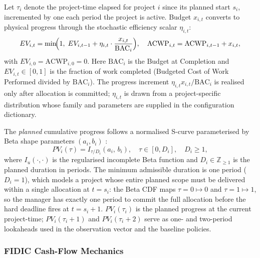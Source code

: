 Let $\tau_i$ denote the project-time elapsed for project $i$ since its
planned start $s_i$, incremented by one each period the project is
active. Budget $x_{i,t}$ converts to physical progress through the
stochastic efficiency scalar $\eta_{i,t}$:
\begin{equation}
  EV_{i,t}
    = \min\!\Bigl(1,\;
        EV_{i,t-1} + \eta_{i,t} \cdot \frac{x_{i,t}}{\mathrm{BAC}_i}
      \Bigr),
  \quad
  \mathrm{ACWP}_{i,t} = \mathrm{ACWP}_{i,t-1} + x_{i,t},
  \label{eq:progress_rec}
\end{equation}
with $EV_{i,0} = \mathrm{ACWP}_{i,0} = 0$. Here $\mathrm{BAC}_i$
is the Budget at Completion and $EV_{i,t} \in [0,1]$ is the fraction
of work completed (Budgeted Cost of Work Performed divided by
$\mathrm{BAC}_i$). The progress increment $\eta_{i,t} x_{i,t} /
\mathrm{BAC}_i$ is realised only after allocation is committed;
$\eta_{i,t}$ is drawn from a project-specific distribution whose family
and parameters are supplied in the configuration dictionary.

The \emph{planned} cumulative progress follows a normalised S-curve
parameterised by Beta shape parameters $(a_i, b_i)$
\citep{Kenley2009}:
\begin{equation}
  PV_i(\tau) = I_{\tau / D_i}(a_i,\, b_i),
  \quad \tau \in [0, D_i],\quad D_i \geq 1,
  \label{eq:scurve}
\end{equation}
where $I_u(\cdot,\cdot)$ is the regularised incomplete Beta function
and $D_i \in \mathbb{Z}_{\geq 1}$ is the planned duration in periods.
The minimum admissible duration is one period ($D_i = 1$), which
models a project whose entire planned scope must be delivered within a
single allocation at $t = s_i$: the Beta CDF maps $\tau = 0
\mapsto 0$ and $\tau = 1 \mapsto 1$, so the manager has exactly one
period to commit the full allocation before the hard deadline fires at
$t = s_i + 1$.
$PV_i(\tau_i)$ is the planned progress at the current project-time;
$PV_i(\tau_i + 1)$ and $PV_i(\tau_i + 2)$ serve as one- and
two-period lookaheads used in the observation vector and the baseline
policies.

\subsubsection{FIDIC Cash-Flow Mechanics}
\label{subsubsec:cashflow}

